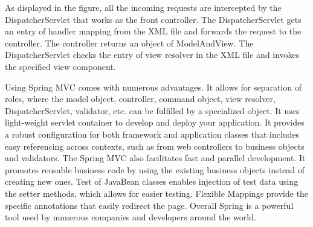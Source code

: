 As displayed in the figure, all the incoming requests are intercepted by the DispatcherServlet that works as the front controller.
The DispatcherServlet gets an entry of handler mapping from the XML file and forwards the request to the controller.
The controller returns an object of ModelAndView.
The DispatcherServlet checks the entry of view resolver in the XML file and invokes the specified view component.

Using Spring MVC comes with numerous advantages. It allows for separation of roles, where the model object, controller, command object, view resolver, DispatcherServlet, validator, etc. can be fulfilled by a specialized object. It uses light-weight servlet container to develop and deploy your application.
It provides a robust configuration for both framework and application classes that includes easy referencing across contexts, such as from web controllers to business objects and validators.
The Spring MVC also facilitates fast and parallel development.
It promotes reusable business code by using the existing business objects instead of creating new ones.
Test of JavaBean classes enables injection of test data using the setter methods, which allows for easier testing.
Flexible Mappings provide the specific annotations that easily redirect the page.
Overall Spring is a powerful tool used by numerous companies and developers around the world.



